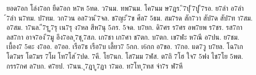 {%
ยอด7อก
โล่ง7อก
ยืด7อก
ห7ห
5ทด.
ว7นม.
ทพ7นม.
โค7นม
ษ7ฎร.
ิ7ปุ
ิ7ปู
ี7รอ.
ย7ลำ
อ7ลำ
้7ลำ
น7ทม.
ป7ทม.
วก7วน
อล7วน
ิ7จล.
ช7ญะ
ี7ข
ศีล7
5ธม.
สม7รด
สัก7วา
สัป7ด
สัป7ท
า7สม.
อ7สม.
า7นล.
ี7รุ
ู7รุ
เน7รุ
ง7หล
สีห7นุ
5ภร.
5จด.
บ7ยก.
ดิ7ศร
ร7ศร
อพ7ยพ
ร7ชร.
รส7กา
ลส7กา
อาจ7อง
ี7มู
อึง7อล
ุ7ชุ
ุ7สภ.
เก7ชา
เก7ศา
ช7ตก.
บ7ตก.
เข7ฬะ
ห7ณี
อ7ปน.
ย7ชม.
เบื้อง7
5คะ
ง7ออ.
อ7ออ.
เรือ7ธ
เรือ7บ
เลี้ยว7
5กก.
เ6กก
อ7ขอ.
า7กอ.
แด7วู
บ7ยล.
โฉ7เก
โด7มร
โต7มร
7โผ
โท7โส
้7ปด.
7คี.
โย7นก.
โส7มม
7ฬส.
ต7ถิ
7โฮ
ใจ7
5ฟง
ไช7โย
5พต.
กรร7กศ
ล7บก.
ศ7ยป.
า7นน.
ุ7ฎา
ู7ฏา
า7มอ.
ท7โท
ุ7ทส
จ่า7ร
ฬ7หี
}

